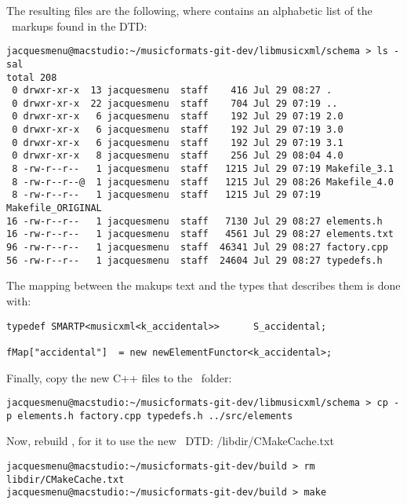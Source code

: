 The resulting files are the following, where  contains an alphabetic list of the \mxml\ markups found in the DTD:
\begin{lstlisting}[language=Terminal]
jacquesmenu@macstudio:~/musicformats-git-dev/libmusicxml/schema > ls -sal
total 208
 0 drwxr-xr-x  13 jacquesmenu  staff    416 Jul 29 08:27 .
 0 drwxr-xr-x  22 jacquesmenu  staff    704 Jul 29 07:19 ..
 0 drwxr-xr-x   6 jacquesmenu  staff    192 Jul 29 07:19 2.0
 0 drwxr-xr-x   6 jacquesmenu  staff    192 Jul 29 07:19 3.0
 0 drwxr-xr-x   6 jacquesmenu  staff    192 Jul 29 07:19 3.1
 0 drwxr-xr-x   8 jacquesmenu  staff    256 Jul 29 08:04 4.0
 8 -rw-r--r--   1 jacquesmenu  staff   1215 Jul 29 07:19 Makefile_3.1
 8 -rw-r--r--@  1 jacquesmenu  staff   1215 Jul 29 08:26 Makefile_4.0
 8 -rw-r--r--   1 jacquesmenu  staff   1215 Jul 29 07:19 Makefile_ORIGINAL
16 -rw-r--r--   1 jacquesmenu  staff   7130 Jul 29 08:27 elements.h
16 -rw-r--r--   1 jacquesmenu  staff   4561 Jul 29 08:27 elements.txt
96 -rw-r--r--   1 jacquesmenu  staff  46341 Jul 29 08:27 factory.cpp
56 -rw-r--r--   1 jacquesmenu  staff  24604 Jul 29 08:27 typedefs.h
\end{lstlisting}

The mapping between the makups text and the types that describes them is done with:
\begin{lstlisting}[language=Terminal]
typedef SMARTP<musicxml<k_accidental>>		S_accidental;

fMap["accidental"] 	= new newElementFunctor<k_accidental>;
\end{lstlisting}

Finally, copy the new C++ files to the \elementsFolder\ folder:
\begin{lstlisting}[language=Terminal]
jacquesmenu@macstudio:~/musicformats-git-dev/libmusicxml/schema > cp -p elements.h factory.cpp typedefs.h ../src/elements
\end{lstlisting}

Now, rebuild \mf, for it to use the new \mxml\ DTD:
/libdir/CMakeCache.txt
\begin{lstlisting}[language=Terminal]
jacquesmenu@macstudio:~/musicformats-git-dev/build > rm libdir/CMakeCache.txt
jacquesmenu@macstudio:~/musicformats-git-dev/build > make
\end{lstlisting}

